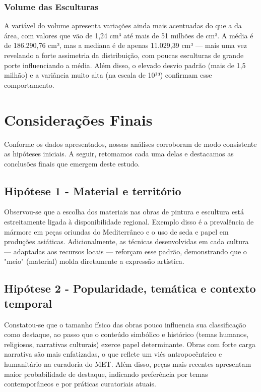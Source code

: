 \documentclass[11pt,a4paper]{article}
\begin{document}
\subsubsection{Volume das Esculturas}
A variável do volume apresenta variações ainda mais acentuadas do que a da área, com valores que vão de 1,24 cm³ até mais de 51 milhões de cm³. A média é de 186.290,76 cm³, mas a mediana é de apenas 11.029,39 cm³ — mais uma vez revelando a forte assimetria da distribuição, com poucas esculturas de grande porte influenciando a média. Além disso, o elevado desvio padrão (mais de 1,5 milhão) e a variância muito alta (na escala de 10¹³) confirmam esse comportamento.

\section{Considerações Finais}
Conforme os dados apresentados, nossas análises corroboram de modo consistente as hipóteses iniciais. A seguir, retomamos cada uma delas e destacamos as conclusões finais que emergem deste estudo.

\subsection*{Hipótese 1 - Material e território}
Observou-se que a escolha dos materiais nas obras de pintura e escultura está estreitamente ligada à disponibilidade regional. Exemplo disso é a prevalência de mármore em peças oriundas do Mediterrâneo e o uso de seda e papel em produções asiáticas. Adicionalmente, as técnicas desenvolvidas em cada cultura — adaptadas aos recursos locais — reforçam esse padrão, demonstrando que o "meio" (material) molda diretamente a expressão artística.

\subsection*{Hipótese 2 - Popularidade, temática e contexto temporal}
Constatou-se que o tamanho físico das obras pouco influencia sua classificação como destaque, ao passo que o conteúdo simbólico e histórico (temas humanos, religiosos, narrativas culturais) exerce papel determinante. Obras com forte carga narrativa são mais enfatizadas, o que reflete um viés antropocêntrico e humanitário na curadoria do MET. Além disso, peças mais recentes apresentam maior probabilidade de destaque, indicando preferência por temas contemporâneos e por práticas curatoriais atuais.
\end{document}
